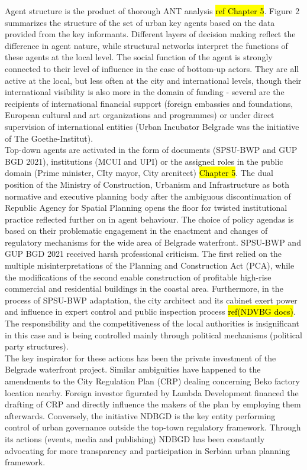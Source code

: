 \documentclass[11pt]{report}
\begin{document}
Agent structure is the product of thorough ANT analysis \hl{ref Chapter 5}. 
Figure 2 summarizes the structure of the set of urban key agents based on the data provided from the key informants.
Different layers of decision making reflect the difference in agent nature, while structural networks interpret the functions of these agents at the local level.
The social function of the agent is strongly connected to their level of influence in the case of bottom-up actors. They are all active at the local, but less often at the city and international levels, though their international visibility is also more in the domain of funding - several are the recipients of international financial support (foreign embassies and foundations, European cultural and art organizations and programmes) or under direct supervision of international entities (Urban Incubator Belgrade was the initiative of The Goethe-Institut).
\\
Top-down agents are activated in the form of documents (SPSU-BWP and GUP BGD 2021), institutions (MCUI and UPI) or the assigned roles in the public domain (Prime minister, CIty mayor, City arcnitect) \hl{Chapter 5}.
The dual position of the Ministry of Construction, Urbanism and Infrastructure as both normative and executive planning body after the ambiguous discontinuation of Republic Agency for Spatial Planning opens the floor for twisted institutional practice reflected further on in agent behaviour. The choice of policy agendas is based on their problematic engagement in the enactment and changes of regulatory mechanisms for the wide area of Belgrade waterfront.
SPSU-BWP and GUP BGD 2021 received harsh professional criticism. The first relied on the multiple misinterpretations of the Planning and Construction Act (PCA), while the modifications of the second enable construction of profitable high-rise commercial and residential buildings in the coastal area. Furthermore, in the process of SPSU-BWP adaptation, the city architect and its cabinet exert power and influence in expert control and public inspection process \hl{ref(NDVBG docs)}.
The responsibility and the competitiveness of the local authorities is insignificant in this case and is being controlled mainly through political mechanisms (political party structures). 
\\
The key inspirator for these actions has been the private investment of the Belgrade waterfront project.
Similar ambiguities have happened to the amendments to the City Regulation Plan (CRP) dealing concerning Beko factory location nearby. Foreign investor figurated by Lambda Development financed the drafting of CRP and directly influence the makers of the plan by employing them afterwards. Conversely, the initiative NDBGD is the key entity performing control of urban governance outside the top-town regulatory framework. Through its actions (events, media and publishing) NDBGD has been constantly advocating for more transparency and participation in Serbian urban planning framework.
\end{document}
